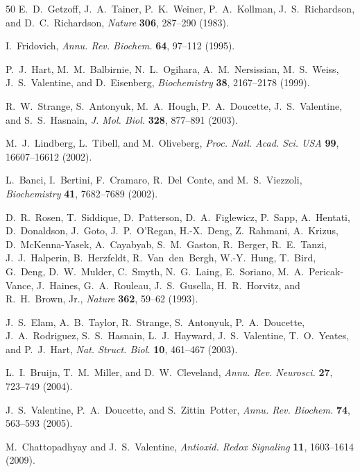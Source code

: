 \documentclass[twocolumn,aps,prx,superscriptaddress,longbibliography]{revtex4-2}
\theoremstyle{remark}
\begin{document}
\begin{thebibliography}{50}
E.~D.~Getzoff, J.~A.~Tainer, P.~K.~Weiner, P.~A.~Kollman,
J.~S.~Richardson, and D.~C.~Richardson,
\textit{Nature} \textbf{306}, 287--290 (1983).

I.~Fridovich,
\textit{Annu. Rev. Biochem.} \textbf{64}, 97--112 (1995).

P.~J.~Hart, M.~M.~Balbirnie, N.~L.~Ogihara, A.~M.~Nersissian,
M.~S.~Weiss, J.~S.~Valentine, and D.~Eisenberg,
\textit{Biochemistry} \textbf{38}, 2167--2178 (1999).

R.~W.~Strange, S.~Antonyuk, M.~A.~Hough, P.~A.~Doucette,
J.~S.~Valentine, and S.~S.~Hasnain,
\textit{J. Mol. Biol.} \textbf{328}, 877--891 (2003).

M.~J.~Lindberg, L.~Tibell, and M.~Oliveberg,
\textit{Proc. Natl. Acad. Sci. USA} \textbf{99}, 16607--16612 (2002).

L.~Banci, I.~Bertini, F.~Cramaro, R.~Del~Conte, and
M.~S.~Viezzoli,
\textit{Biochemistry} \textbf{41}, 7682--7689 (2002).


D.~R.~Rosen, T.~Siddique, D.~Patterson, D.~A.~Figlewicz, P.~Sapp,
A.~Hentati, D.~Donaldson, J.~Goto, J.~P.~O'Regan, H.-X.~Deng,
Z.~Rahmani, A.~Krizus, D.~McKenna-Yasek, A.~Cayabyab, S.~M.~Gaston,
R.~Berger, R.~E.~Tanzi, J.~J.~Halperin, B.~Herzfeldt,
R.~Van~den~Bergh, W.-Y.~Hung, T.~Bird, G.~Deng, D.~W.~Mulder,
C.~Smyth, N.~G.~Laing, E.~Soriano, M.~A.~Pericak-Vance,
J.~Haines, G.~A.~Rouleau, J.~S.~Gusella, H.~R.~Horvitz, and
R.~H.~Brown, Jr.,
\textit{Nature} \textbf{362}, 59--62 (1993).

J.~S.~Elam, A.~B.~Taylor, R.~Strange, S.~Antonyuk, P.~A.~Doucette,
J.~A.~Rodriguez, S.~S.~Hasnain, L.~J.~Hayward, J.~S.~Valentine,
T.~O.~Yeates, and P.~J.~Hart,
\textit{Nat. Struct. Biol.} \textbf{10}, 461--467 (2003).

L.~I.~Bruijn, T.~M.~Miller, and D.~W.~Cleveland,
\textit{Annu. Rev. Neurosci.} \textbf{27}, 723--749 (2004).

J.~S.~Valentine, P.~A.~Doucette, and S.~Zittin~Potter,
\textit{Annu. Rev. Biochem.} \textbf{74}, 563--593 (2005).

M.~Chattopadhyay and J.~S.~Valentine,
\textit{Antioxid. Redox Signaling} \textbf{11}, 1603--1614 (2009).



\end{thebibliography}
\end{document}
